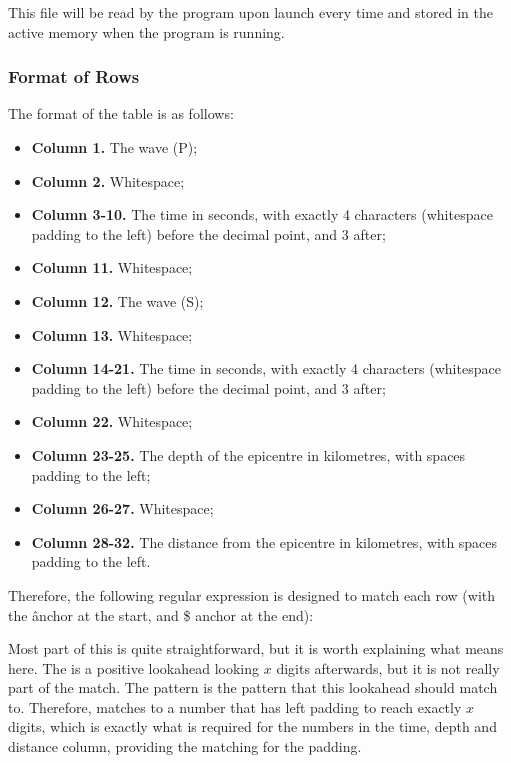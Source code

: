 This file will be read by the program upon launch every time and stored in the active memory when the program is running.

\subsubsection{Format of Rows}

The format of the table is as follows:
\begin{itemize}
    \item \textbf{Column 1.} The wave (P);
    \item \textbf{Column 2.} Whitespace;
    \item \textbf{Column 3-10.} The time in seconds, with exactly 4 characters (whitespace padding to the left) before the decimal point, and 3 after;
    \item \textbf{Column 11.} Whitespace;
    \item \textbf{Column 12.} The wave (S);
    \item \textbf{Column 13.} Whitespace;
    \item \textbf{Column 14-21.} The time in seconds, with exactly 4 characters (whitespace padding to the left) before the decimal point, and 3 after;
    \item \textbf{Column 22.} Whitespace;
    \item \textbf{Column 23-25.} The depth of the epicentre in kilometres, with spaces padding to the left;
    \item \textbf{Column 26-27.} Whitespace;
    \item \textbf{Column 28-32.} The distance from the epicentre in kilometres, with spaces padding to the left.
\end{itemize}

Therefore, the following regular expression is designed to match each row (with the \^ anchor at the start, and \$ anchor at the end):
\begin{center}
\end{center}

Most part of this is quite straightforward, but it is worth explaining what  means here. The  is a positive lookahead looking \(x\) digits afterwards, but it is not really part of the match. The pattern \Code{ *\d+} is the pattern that this lookahead should match to. Therefore,  matches to a number that has left padding to reach exactly \(x\) digits, which is exactly what is required for the numbers in the time, depth and distance column, providing the matching for the padding.

